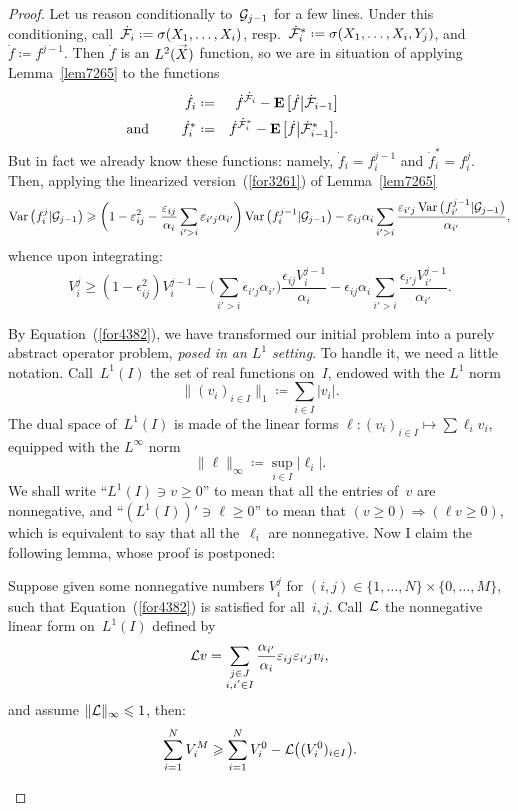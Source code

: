 \begin{proof}
Let us reason conditionally to~$\mathcal{G}_{j-1}$ for a few lines.
Under this conditioning, call~$\dot{\mcal{F}}_i \coloneqq \sigma(X_1,\ldots,X_i)$,
resp.\ $\dot{\mcal{F}}^*_i \coloneqq \sigma(X_1,\ldots,X_i,Y_j)$, and $\dot{f} \coloneqq f^{j-1}$.
Then $\dot{f}$ is an $\ldb(\vec{X})$ function,
so we are in situation of applying Lemma~\ref{lem7265} to the functions
\begin{eqnarray} \dot{f}_i &\coloneqq& \dot{f}^{\dot{\mcal{F}}_i} - \EE\big[\dot{f}\big|\dot{\mcal{F}}_{i-1}\big] \\
\text{\llap{and \qquad}{}} \dot{f}^*_i &\coloneqq& \dot{f}^{\dot{\mcal{F}}^*_i} - \EE\big[\dot{f}\big|\dot{\mcal{F}}^*_{i-1}\big] .
\end{eqnarray}
%
But in fact we already know these functions:
namely, $\dot{f}_i = f^{j-1}_i$ and $\dot{f}^*_i = f^j_i$.
Then, applying the linearized version~(\ref{for3261}) of Lemma~\ref{lem7265}
\[ \Var \big( f^j_i|\mcal{G}_{j-1} \big) \geq \\
\bigg( 1-\epsilon_{ij}^2 - \frac{\epsilon_{ij}}{\alpha_i} \sum_{i'>i} \epsilon_{i'j}\alpha_{i'} \bigg)
\Var \big( f^{j-1}_i|\mcal{G}_{j-1} \big)
- \epsilon_{ij}\alpha_i \sum_{i'>i} \frac{\epsilon_{i'j}\Var\big( f^{j-1}_{i'}|\mcal{G}_{j-1} \big)}{\alpha_{i'}} , \]
whence upon integrating:
\[\label{for4382}
V^j_i \geq (1-\epsilon_{ij}^2) V^{j-1}_i
- \Big(\sum_{i'>i} \epsilon_{i'j}\alpha_{i'}\Big) \frac{\epsilon_{ij} V^{j-1}_i}{\alpha_i}
- \epsilon_{ij}\alpha_i \sum_{i'>i} \frac{\epsilon_{i'j}V^{j-1}_{i'}}{\alpha_{i'}} .\]

By Equation~(\ref{for4382}), we have transformed our initial problem
into a purely abstract operator problem, \emph{posed in an $L^1$ setting}.
%
To handle it, we need a little notation.
Call~$L^1(I)$ the set of real functions on~$I$,
endowed with the $L^1$ norm
\[ \big\| (v_i)_{i\in I} \big\|_1 \coloneqq \sum_{i\in I} |v_i| .\]
The dual space of~$L^1(I)$ is made of the linear forms
$\ell \colon (v_i)_{i\in I} \mapsto \sum \ell_i v_i$,
equipped with the $L^{\infty}$ norm
\[ \| \ell \|_{\infty} \coloneqq \sup_{i\in I} |\ell_i| .\]
We shall write ``$L^1(I) \ni v \geq 0$'' to mean that all the entries of~$v$ are nonnegative,
and ``$(L^1(I))' \ni \ell \geq 0$'' to mean that
$(v \geq 0) \Rightarrow (\ell v \geq 0)$, which is equivalent to say that
all the~$\ell_i$ are nonnegative.
%
Now I claim the following lemma, whose proof is postponed:
\begin{Lem}\label{lem5453}
Suppose given some nonnegative numbers $V^j_i$ for
$(i,j) \in \{1,\ldots,N\} \times \{0,\ldots,M\}$,
such that Equation~(\ref{for4382}) is satisfied for all~$i,j$.
Call~$\mathcal{L}$ the nonnegative linear form on~$L^1(I)$ defined by
\[ \mathcal{L}v = \sum_{\substack{j\in J\\i,i'\in I}} \frac{\alpha_{i'}}{\alpha_i} \varepsilon_{ij}\varepsilon_{i'j} v_i ,\]
and assume $\|\mathcal{L}\|_{\infty} \leqslant 1$,
then:
\[\label{for6376}
\sum_{i=1}^N V^M_i \geq \sum_{i=1}^N V^0_i - \mcal{L}\big( (V^0_i)_{i\in I} \big) .\]
\end{Lem}


\end{proof}
